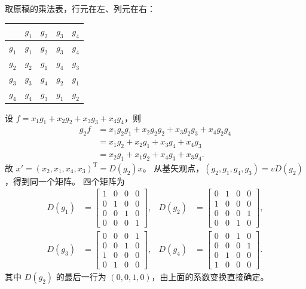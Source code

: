 \begin{example}[四阶群的正则表示]
取原稿的乘法表，行元在左、列元在右：
\begin{center}
\begin{tabular}{c|cccc}
\toprule
 & $g_1$ & $g_2$ & $g_3$ & $g_4$\\\midrule
$g_1$ & $g_1$ & $g_2$ & $g_3$ & $g_4$\\
$g_2$ & $g_2$ & $g_1$ & $g_4$ & $g_3$\\
$g_3$ & $g_3$ & $g_4$ & $g_2$ & $g_1$\\
$g_4$ & $g_4$ & $g_3$ & $g_1$ & $g_2$\\\bottomrule
\end{tabular}
\end{center}
设 $f=x_1g_1+x_2g_2+x_3g_3+x_4g_4$，则
\begin{align}
g_2f&=x_1g_2g_1+x_2g_2g_2+x_3g_2g_3+x_4g_2g_4\\
&=x_1g_2+x_2g_1+x_3g_4+x_4g_3\\
&=x_2g_1+x_1g_2+x_4g_3+x_3g_4.
\end{align}
故 $x'=\left(x_2,x_1,x_4,x_3\right)^{\mathrm{T}}=D\left(g_2\right)x$。
从基矢观点，$\left(g_2,g_1,g_4,g_3\right)=vD\left(g_2\right)$，得到同一个矩阵。
四个矩阵为
\begin{align}
D\left(g_1\right)&=\begin{bmatrix}1&0&0&0\\0&1&0&0\\0&0&1&0\\0&0&0&1\end{bmatrix},&
D\left(g_2\right)&=\begin{bmatrix}0&1&0&0\\1&0&0&0\\0&0&0&1\\0&0&1&0\end{bmatrix},\\
D\left(g_3\right)&=\begin{bmatrix}0&0&0&1\\0&0&1&0\\1&0&0&0\\0&1&0&0\end{bmatrix},&
D\left(g_4\right)&=\begin{bmatrix}0&0&1&0\\0&0&0&1\\0&1&0&0\\1&0&0&0\end{bmatrix}.
\end{align}
其中 $D\left(g_2\right)$ 的最后一行为 $\left(0,0,1,0\right)$，由上面的系数变换直接确定。
\end{example}

